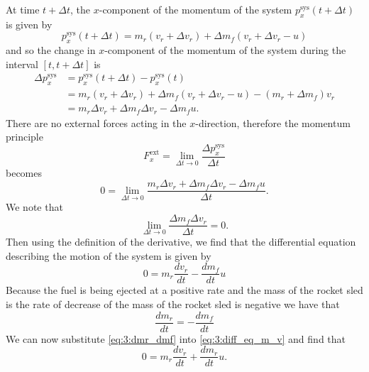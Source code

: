 \documentclass{esg8012exam}
\begin{document}
\begin{solution}
\begin{enumerate}[(a)]
      At time $t+\Delta t$, the $x$-component of the momentum of the system $p_x^\text{sys} (t+\Delta t)$ is given by 
      \begin{equation} p_x^\text{sys} (t+\Delta t) = m_r (v_r +\Delta v_r )+\Delta m_f (v_r +\Delta v_r -u) \label{eq:3:p_x^sys(t+delta_t)} \end{equation}
      and so the change in $x$-component of the momentum of the system during the interval $[t,t+\Delta t]$ is
      \begin{align}
        \Delta p_x^\text{sys} & = p_x^\text{sys} (t+\Delta t)-p_x^\text{sys} (t) \nonumber \\
          & = m_r (v_r +\Delta v_r )+\Delta m_f (v_r +\Delta v_r -u)-(m_r +\Delta m_f )v_r \nonumber \\ 
          & = m_r \Delta v_r +\Delta m_f \Delta v_r -\Delta m_f u. \label{eq:3:delta_p_x^sys}
      \end{align}
      There are no external forces acting in the $x$-direction, therefore the momentum principle 
      \begin{equation} F_x^\text{ext} =\lim_{\Delta t\to 0} \frac{\Delta p_x^\text{sys} }{\Delta t} \label{eq:3:F_x^ext=lim} \end{equation}
      becomes
      \begin{equation} 0 = \lim_{\Delta t\to 0} \frac{m_r \Delta v_r +\Delta m_f \Delta v_r -\Delta m_f u}{\Delta t}. \label{eq:3:expanded_F_ext} \end{equation}
      We note that 
      \begin{equation} \lim_{\Delta t\to 0} \frac{\Delta m_f \Delta v_r }{\Delta t}=0. \label{eq:3:second_order_differential_zero} \end{equation}
      Then using the definition of the derivative, we find that the differential equation describing the motion of the system is given by
      \begin{equation} 0=m_r \frac{dv_r }{dt}-\frac{dm_f }{dt}u \label{eq:3:diff_eq_m_v} \end{equation}
      Because the fuel is being ejected at a positive rate and the mass of the rocket sled is the rate of decrease of the mass of the rocket sled is  negative we have that 
      \begin{equation} \frac{dm_r }{dt}=-\frac{dm_f }{dt} \label{eq:3:dmr_dmf} \end{equation}
      We can now substitute \autoref{eq:3:dmr_dmf} into \autoref{eq:3:diff_eq_m_v} and find that
      \begin{equation} 0=m_r \frac{dv_r }{dt}+\frac{dm_r }{dt}u. \label{eq:3:diff_eq_mr_v} \end{equation}

\end{enumerate}
\end{solution}
\end{document}
